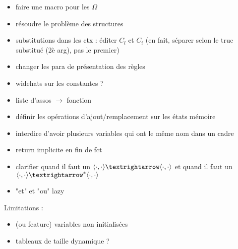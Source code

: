 \begin{itemize}
\item faire une macro pour les $Ω$
\item résoudre le problème des structures
\item substitutions dans les ctx : éditer $C_l$ et $C_i$
  (en fait, séparer selon le truc substitué (2è arg), pas le premier)
\item changer les para de présentation des règles
\item widehats sur les constantes ?
\item liste d'assos $→$ fonction
\item définir les opérations d'ajout/remplacement sur les états mémoire
\item interdire d'avoir plusieurs variables qui ont le même nom dans un cadre
\item return implicite en fin de fct
\item clarifier quand il faut un $\mm{\cdot}{\cdot}{\cdot}{\cdot}$
             et quand il faut un $\mmstar{\cdot}{\cdot}{\cdot}{\cdot}$
\item "et" et "ou" lazy
\end{itemize}

Limitations :

\begin{itemize}
\item (ou feature) variables non initialisées
\item tableaux de taille dynamique ?
\end{itemize}

